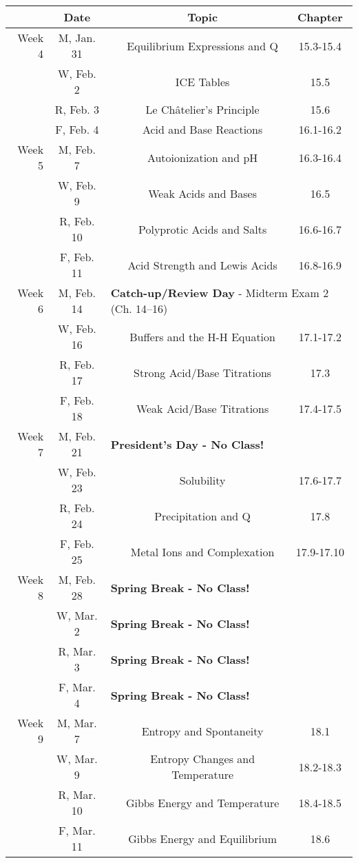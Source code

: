 \documentclass[12pt, letterpaper]{article}
\begin{document}
\begin{tabular}{rcccc}
    & Date && Topic & Chapter\\	
	\midrule
	Week 4 & M, Jan. 31&& Equilibrium Expressions and Q & 15.3-15.4\\
	& W, Feb. 2&& ICE Tables & 15.5\\
	& R, Feb. 3&& Le Ch\^atelier's Principle & 15.6\\
	& F, Feb. 4&& Acid and Base Reactions & 16.1-16.2\\
	\midrule
	Week 5 & M, Feb. 7&& Autoionization and pH & 16.3-16.4\\
	& W, Feb. 9&& Weak Acids and Bases & 16.5\\
	& R, Feb. 10&& Polyprotic Acids and Salts & 16.6-16.7\\
	& F, Feb. 11&& Acid Strength and Lewis Acids & 16.8-16.9\\
	\midrule
	Week 6 & M, Feb. 14& \multicolumn{3}{l}{\textbf{Catch-up/Review Day} - Midterm Exam 2 (Ch. 14--16)}\\
	& W, Feb. 16&& Buffers and the H-H Equation & 17.1-17.2\\
	& R, Feb. 17&& Strong Acid/Base Titrations & 17.3\\
	& F, Feb. 18&& Weak Acid/Base Titrations & 17.4-17.5\\
	\midrule
	Week 7 & M, Feb. 21& \multicolumn{3}{l}{\textbf{President's Day - No Class!}}\\
	& W, Feb. 23&& Solubility & 17.6-17.7\\
	& R, Feb. 24&& Precipitation and Q & 17.8\\
	& F, Feb. 25&& Metal Ions and Complexation & 17.9-17.10\\
	\midrule
	Week 8 & M, Feb. 28& \multicolumn{3}{l}{\textbf{Spring Break - No Class!}}\\
	& W, Mar. 2& \multicolumn{3}{l}{\textbf{Spring Break - No Class!}}\\
	& R, Mar. 3& \multicolumn{3}{l}{\textbf{Spring Break - No Class!}}\\
	& F, Mar. 4& \multicolumn{3}{l}{\textbf{Spring Break - No Class!}}\\
	\midrule
	Week 9 & M, Mar. 7&& Entropy and Spontaneity & 18.1\\
	& W, Mar. 9&& Entropy Changes and Temperature & 18.2-18.3\\
	& R, Mar. 10&& Gibbs Energy and Temperature & 18.4-18.5\\
	& F, Mar. 11&& Gibbs Energy and Equilibrium & 18.6\\
\end{tabular}
\end{document}
